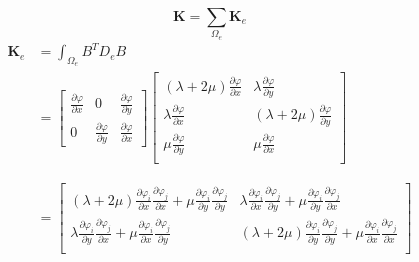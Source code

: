 \documentclass[12pt]{article}
\begin{document}
%
\begin{equation}	\label{eq48a}
\mathbf{K}=\sum_{\Omega_e}\mathbf{K}_e
\end{equation}
%
\begin{equation}	\label{eq49a}
\begin{split}
\mathbf{K}_e&=\int_{\Omega_e}B^TD_eB	\\
&= 
 \left[
\begin{array}{ccc}
\frac{\partial \varphi}{\partial x} & 0  &   \frac{\partial \varphi}{\partial y}			\\
0 &\frac{\partial \varphi}{\partial y} 	& \frac{\partial \varphi}{\partial x}			
\end{array}
\right]
%
\left[
\begin{array}{cc}
(\lambda+2\mu)\frac{\partial \varphi}{\partial x} & \lambda\frac{\partial \varphi}{\partial y}  			\\
\lambda\frac{\partial \varphi}{\partial x} &	(\lambda+2\mu)\frac{\partial \varphi}{\partial y} 			\\
\mu\frac{\partial \varphi}{\partial y} & \mu\frac{\partial \varphi}{\partial x}  			\\
\end{array}
\right]	\\	\\	\\
%
&=
\left[
\begin{array}{cc}
(\lambda+2\mu)\frac{\partial \varphi_i}{\partial x}\frac{\partial \varphi_j}{\partial x}+\mu\frac{\partial \varphi_i}{\partial y}\frac{\partial \varphi_j}{\partial y} & \lambda\frac{\partial \varphi_i}{\partial x}\frac{\partial \varphi_j}{\partial y} + \mu\frac{\partial \varphi_i}{\partial y}\frac{\partial \varphi_j}{\partial x}  	\\
%
\lambda\frac{\partial \varphi_i}{\partial y}\frac{\partial \varphi_j}{\partial x}+\mu\frac{\partial \varphi_i}{\partial x}\frac{\partial \varphi_j}{\partial y}   & (\lambda+2\mu)\frac{\partial \varphi_i}{\partial y}\frac{\partial \varphi_j}{\partial y}+\mu\frac{\partial \varphi_i}{\partial x}\frac{\partial \varphi_j}{\partial x}  \\
\end{array}
\right]	
\end{split}
\end{equation}
\end{document}
